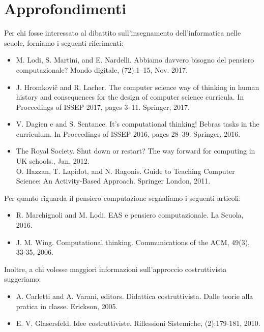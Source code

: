 \documentclass[12pt]{article}
\begin{document}
\section{Approfondimenti}
Per chi fosse interessato al dibattito sull'insegnamento dell'informatica nelle scuole, forniamo i seguenti riferimenti:\\
\begin{itemize}
\item M. Lodi, S. Martini, and E. Nardelli. Abbiamo davvero bisogno del pensiero computazionale? Mondo digitale, (72):1–15, Nov. 2017.\\
\item J. Hromkovič and R. Lacher. The computer science way of thinking in human history and consequences for the design of computer science curricula. In Proceedings of ISSEP 2017, pages 3–11. Springer, 2017.\\
\item V. Dagien e and S. Sentance. It’s computational thinking! Bebras tasks in the curriculum. In Proceedings of ISSEP 2016, pages 28–39. Springer, 2016.\\
\item The Royal Society. Shut down or restart? The way forward for computing in UK schools., Jan. 2012.\\
O. Hazzan, T. Lapidot, and N. Ragonis. Guide to Teaching Computer Science: An Activity-Based Approach. Springer London, 2011.\\
\end{itemize}
Per quanto riguarda il pensiero computazione segnaliamo i seguenti articoli:\\
\begin{itemize}
\item R. Marchignoli and M. Lodi. EAS e pensiero computazionale. La Scuola, 2016.\\
\item J. M. Wing. Computational thinking. Communications of the ACM, 49(3), 33-35, 2006.\\
\end{itemize}
Inoltre, a chi volesse maggiori informazioni sull'approccio costruttivista suggeriamo:\\
\begin{itemize}
\item A. Carletti and A. Varani, editors. Didattica costruttivista. Dalle teorie alla pratica in classe. Erickson, 2005.\\
\item E. V. Glasersfeld. Idee costruttiviste. Riflessioni Sistemiche, (2):179-181, 2010.\\
\end{itemize}

%
%
\end{document}
